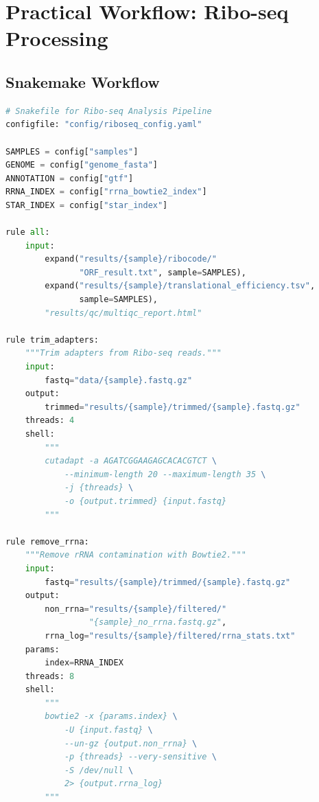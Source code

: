 \section{Practical Workflow: Ribo-seq Processing}
\label{sec:specialized:riboseq-workflow}

\subsection{Snakemake Workflow}
\label{subsec:specialized:riboseq-snakemake}

\begin{lstlisting}[language=Python, caption={Snakemake workflow for Ribo-seq analysis.}, label={lst:specialized:riboseq-snakemake}]
# Snakefile for Ribo-seq Analysis Pipeline
configfile: "config/riboseq_config.yaml"

SAMPLES = config["samples"]
GENOME = config["genome_fasta"]
ANNOTATION = config["gtf"]
RRNA_INDEX = config["rrna_bowtie2_index"]
STAR_INDEX = config["star_index"]

rule all:
    input:
        expand("results/{sample}/ribocode/"
               "ORF_result.txt", sample=SAMPLES),
        expand("results/{sample}/translational_efficiency.tsv",
               sample=SAMPLES),
        "results/qc/multiqc_report.html"

rule trim_adapters:
    """Trim adapters from Ribo-seq reads."""
    input:
        fastq="data/{sample}.fastq.gz"
    output:
        trimmed="results/{sample}/trimmed/{sample}.fastq.gz"
    threads: 4
    shell:
        """
        cutadapt -a AGATCGGAAGAGCACACGTCT \
            --minimum-length 20 --maximum-length 35 \
            -j {threads} \
            -o {output.trimmed} {input.fastq}
        """

rule remove_rrna:
    """Remove rRNA contamination with Bowtie2."""
    input:
        fastq="results/{sample}/trimmed/{sample}.fastq.gz"
    output:
        non_rrna="results/{sample}/filtered/"
                 "{sample}_no_rrna.fastq.gz",
        rrna_log="results/{sample}/filtered/rrna_stats.txt"
    params:
        index=RRNA_INDEX
    threads: 8
    shell:
        """
        bowtie2 -x {params.index} \
            -U {input.fastq} \
            --un-gz {output.non_rrna} \
            -p {threads} --very-sensitive \
            -S /dev/null \
            2> {output.rrna_log}
        """


\end{lstlisting}
